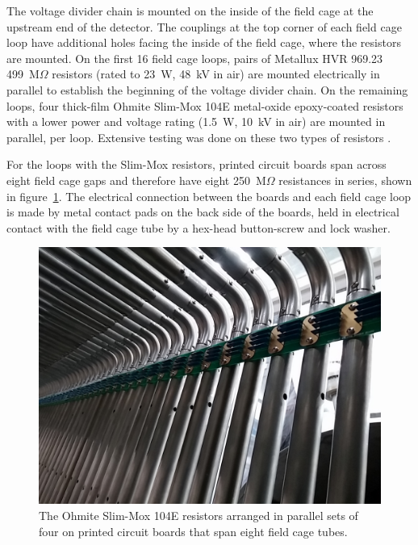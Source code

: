 The voltage divider chain is mounted on the inside of the field cage at the upstream end of the detector. The couplings at the top corner of each field cage loop have additional holes facing the inside of the field cage, where the resistors are mounted. On the first 16 field cage loops, pairs of Metallux HVR 969.23 499~M$\Omega$ resistors (rated to 23~W, 48~kV in air) are mounted electrically in parallel to establish the beginning of the voltage divider chain. On the remaining loops, four thick-film Ohmite Slim-Mox 104E metal-oxide epoxy-coated resistors with a lower power and voltage rating (1.5~W, 10~kV in air) are mounted in parallel, per loop.  Extensive testing was done on these two types of resistors \cite{Bagby:2014wva}. 


For the loops with the Slim-Mox resistors, printed circuit boards span across eight field cage gaps and therefore have eight 250~M$\Omega$ resistances in series, shown in figure~\ref{fig:tpc-voltage-divider-slimmox}. The electrical connection between the boards and each field cage loop is made by metal contact pads on the back side of the boards, held in electrical contact with the field cage tube by a hex-head button-screw and lock washer.

\begin{figure}
\centering	
\includegraphics[width=0.8\linewidth]{figures/tpc-voltage-divider-slimmox.jpg}
\caption{The Ohmite Slim-Mox 104E resistors arranged in parallel sets of four on printed circuit boards that span eight field cage tubes.}
\label{fig:tpc-voltage-divider-slimmox}
\end{figure}

